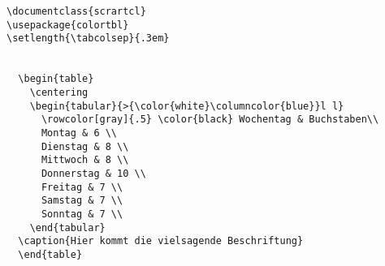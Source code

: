 % 

\begin{lstlisting}
\documentclass{scrartcl}
\usepackage{colortbl}
\setlength{\tabcolsep}{.3em}


  \begin{table}
    \centering
    \begin{tabular}{>{\color{white}\columncolor{blue}}l l}
      \rowcolor[gray]{.5} \color{black} Wochentag & Buchstaben\\
      Montag & 6 \\
      Dienstag & 8 \\
      Mittwoch & 8 \\
      Donnerstag & 10 \\
      Freitag & 7 \\
      Samstag & 7 \\
      Sonntag & 7 \\
    \end{tabular}
  \caption{Hier kommt die vielsagende Beschriftung}
  \end{table}

\end{lstlisting}